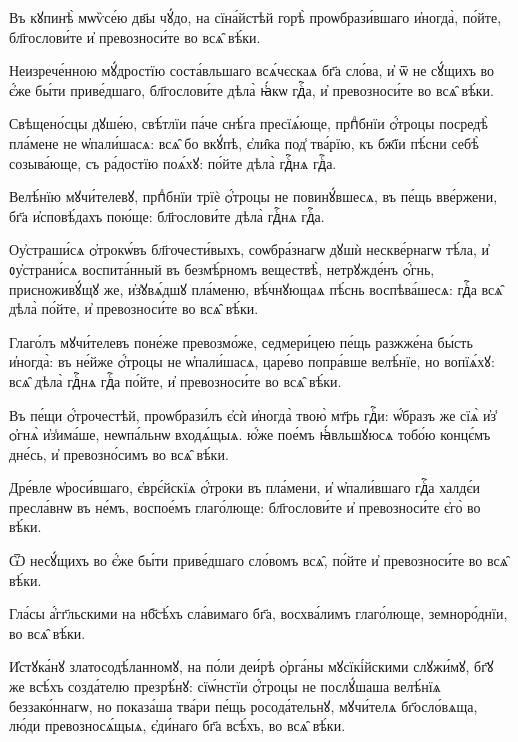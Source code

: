\hKv Въ кꙋпинѣ̀ мѡѷсе́ю дв҃ы чꙋ́до, на сїна́йстѣй горѣ̀  проѡбрази́вшаго и҆ногда̀, по́йте, бл҃гослови́те и҆  превозноси́те во всѧ̑ вѣ́ки.  

\hKv Неизрече́нною мꙋ́дростїю соста́вльшаго всѧ́чєскаѧ бг҃а  сло́ва, и҆ ѿ не сꙋ́щихъ во є҆́же бы́ти приве́дшаго,  бл҃гослови́те дѣла̀ ꙗ҆́кѡ гдⷭ҇а, и҆ превозноси́те во всѧ̑  вѣ́ки.  

\hKv Свѣщено́сцы дꙋше́ю, свѣ́тлїи па́че снѣ́га пресїѧ́юще,  прпⷣбнїи ѻ҆́троцы посредѣ̀ пла́мене не ѡ҆пали́шасѧ: всѧ̑  бо вкꙋ́пѣ, є҆ли̑ка под̾ тва́рїю, къ бж҃їи пѣ́сни себѣ̀  созыва́юще, съ ра́достїю поѧ́хꙋ: по́йте дѣла̀ гдⷭ҇нѧ гдⷭ҇а. 

\hKv Велѣ́нїю мꙋчи́телевꙋ, прпⷣбнїи трїѐ ѻ҆́троцы не  повинꙋ́вшесѧ, въ пе́щь вве́ржени, бг҃а и҆сповѣ́дахъ пою́ще:  бл҃гослови́те дѣла̀ гдⷭ҇нѧ гдⷭ҇а. 

\hKv Оу҆страши́сѧ ѻ҆трокѡ́въ бл҃гочести́выхъ, соѡбра́знагѡ  дꙋшѝ нескве́рнагѡ тѣ́ла, и҆ ᲂу҆страни́сѧ воспита́нный въ  безмѣ́рномъ веществѣ̀, нетрꙋжде́нъ ѻ҆́гнь, присноживꙋ́щꙋ  же, и҆з̾ꙋвѧ́дшꙋ пла́меню, вѣ́чнꙋющаѧ пѣ́снь  воспѣва́шесѧ: гдⷭ҇а всѧ̑ дѣла̀ по́йте, и҆ превозноси́те во  всѧ̑ вѣ́ки. 

\hKv Глаго́лъ мꙋчи́телевъ поне́же превозмо́же, седмери́цею пе́щь  разжже́на бы́сть и҆ногда̀: въ не́йже ѻ҆́троцы не  ѡ҆пали́шасѧ, царе́во попра́вше велѣ́нїе, но вопїѧ́хꙋ: всѧ̑  дѣла̀  гдⷭ҇нѧ гдⷭ҇а по́йте, и҆  превозноси́те во всѧ̑ вѣ́ки. 
%

\hKv Въ пе́щи ѻ҆́трочестѣй, проѡбрази́лъ  є҆сѝ и҆ногда̀ твою̀ мт҃рь гдⷭ҇и: ѡ҆́бразъ же сїѧ̀ и҆з̾  ѻ҆гнѧ̀ и҆з̾има́ше, неѡпа́льнѡ входѧ́щыѧ. ю҆́же пое́мъ  ꙗ҆́вльшꙋюсѧ тобо́ю концє́мъ дне́сь, и҆ превозно́симъ во  всѧ̑ вѣ́ки. 

\hKv Дре́вле ѡ҆роси́вшаго, є҆врє́йскїѧ ѻ҆́троки въ пла́мени,  и҆ ѡ҆пали́вшаго гдⷭ҇а халдє́и пресла́внѡ въ не́мъ,  воспое́мъ глаго́люще: бл҃гослови́те и҆ превозноси́те є҆го̀  во вѣ́ки. 

\hKv Ѿ несꙋ́щихъ во є҆́же бы́ти приве́дшаго сло́вомъ всѧ̑,  по́йте и҆ превозноси́те во всѧ̑ вѣ́ки. 

\hKv Гла́сы а҆́гг҃льскими на нб҃сѣ́хъ сла́вимаго бг҃а,  восхва́лимъ глаго́люще, земноро́днїи, во всѧ̑ вѣ́ки. 

\hKv И҆стꙋка́нꙋ златосодѣ́ланномꙋ, на по́ли деи́рѣ ѻ҆рга́ны  мꙋсїкі́йскими слꙋжи́мꙋ, бг҃ꙋ    же всѣ́хъ созда́телю презрѣ́нꙋ: сїѡ́нстїи ѻ҆́троцы не  послꙋ́шаша велѣ́нїѧ беззако́ннагѡ, но показа́ша тва́ри  пе́щь росода́тельнꙋ, мꙋчи́телѧ бг҃осло́вѧща, лю́ди  превозносѧ́щыѧ, є҆ди́наго бг҃а всѣ́хъ, во всѧ̑ вѣ́ки. 

